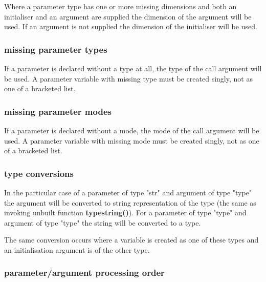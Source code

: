                 Where a parameter type has one or more missing dimensions and
                both an initialiser and an argument are supplied the dimension
                of the argument will be used. If an argument is not supplied
                the dimension of the initialiser will be used.

            \subsubsection{missing parameter types}

                If a parameter is declared without a type at all, the type of
                the call argument will be used.
                A parameter variable with missing type must be created singly,
                not as one of a bracketed list.

            \subsubsection{missing parameter modes}

                If a parameter is declared without a mode, the mode of
                the call argument will be used.
                A parameter variable with missing mode must be created singly,
                not as one of a bracketed list.

            \subsubsection{type conversions}
            
                In the particular case of a parameter of type "str" and argument of
                type "type" the argument will be converted to string representation
                of the type (the same as invoking unbuilt function {\bf
                typestring()}). For a parameter of type "type" and argument of type
                "type"  the string will be converted to a type.
                
                The same conversion occurs where a variable is created as one of
                these types and an initialisation argument is of the other type.

            \subsubsection{parameter/argument processing order}

